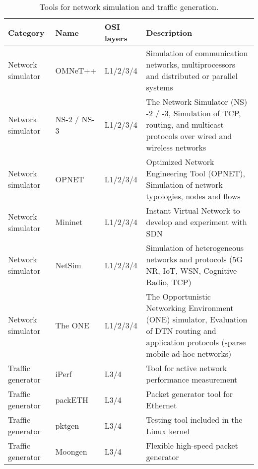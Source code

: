\begin{table}[htp]
	\caption{Tools for network simulation and traffic generation.}
	\centering
	\label{tab:IEEECOMSTsimulation}
	\def\arraystretch{1.2}%
	\setlength\tabcolsep{2.0pt} %
	{\scriptsize
		\begin{tabular}{>{\centering\arraybackslash}m{}
			>{\centering\arraybackslash}m{}
			>{\centering\arraybackslash}m{}
			>{\centering\arraybackslash}m{}
		}
		\toprule
		\textbf{Category} & \textbf{Name} & \textbf{OSI layers} & \textbf{Description} \\
		\midrule
		\midrule
		Network simulator & OMNeT++ \cite{Varga2008} & L1/2/3/4 & Simulation of communication networks, multiprocessors and distributed or parallel systems \\
		Network simulator & NS-2 \cite{Issariyakul2009} / NS-3 \cite{Henderson2008} & L1/2/3/4 & The Network Simulator (NS) -2 / -3, Simulation of TCP, routing, and multicast protocols over wired and wireless networks \\
		Network simulator & OPNET \cite{Chang1999} & L1/2/3/4 & Optimized Network Engineering Tool (OPNET), Simulation of network typologies, nodes and flows \\
		Network simulator & Mininet \cite{Mininet} & L1/2/3/4 & Instant Virtual Network to develop and experiment with SDN \\
		Network simulator & NetSim \cite{NetSim} & L1/2/3/4 & Simulation of heterogeneous networks and protocols (5G NR, IoT, WSN, Cognitive Radio, TCP) \\
		Network simulator & The ONE \cite{Keranen2009} & L1/2/3/4 & The Opportunistic Networking Environment (ONE) simulator, Evaluation of DTN routing and application protocols (sparse mobile ad-hoc networks) \\
		Traffic generator & iPerf \cite{iPerf} & L3/4 & Tool for active network performance measurement \\
		Traffic generator & packETH \cite{packETH} & L3/4 & Packet generator tool for Ethernet \\
		Traffic generator & pktgen \cite{Olsson2005} & L3/4 & Testing tool included in the Linux kernel \\
		Traffic generator & Moongen \cite{Emmerich2015} & L3/4 & Flexible high-speed packet generator \\

\end{tabular}}
\end{table}
